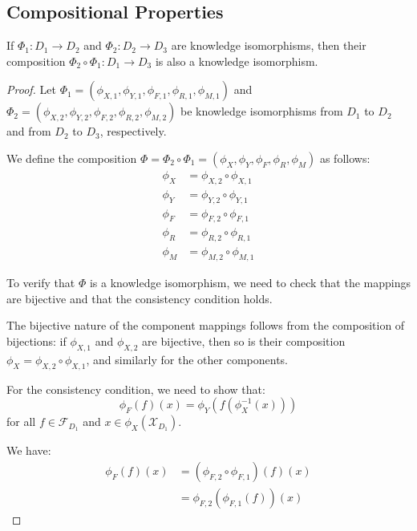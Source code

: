 \subsection{Compositional Properties}

\begin{theorem}
If $\Phi_1: D_1 \to D_2$ and $\Phi_2: D_2 \to D_3$ are knowledge isomorphisms, then their composition $\Phi_2 \circ \Phi_1: D_1 \to D_3$ is also a knowledge isomorphism.
\end{theorem}

\begin{proof}
Let $\Phi_1 = (\phi_{X,1}, \phi_{Y,1}, \phi_{F,1}, \phi_{R,1}, \phi_{M,1})$ and $\Phi_2 = (\phi_{X,2}, \phi_{Y,2}, \phi_{F,2}, \phi_{R,2}, \phi_{M,2})$ be knowledge isomorphisms from $D_1$ to $D_2$ and from $D_2$ to $D_3$, respectively.

We define the composition $\Phi = \Phi_2 \circ \Phi_1 = (\phi_X, \phi_Y, \phi_F, \phi_R, \phi_M)$ as follows:
\begin{align}
\phi_X &= \phi_{X,2} \circ \phi_{X,1} \\
\phi_Y &= \phi_{Y,2} \circ \phi_{Y,1} \\
\phi_F &= \phi_{F,2} \circ \phi_{F,1} \\
\phi_R &= \phi_{R,2} \circ \phi_{R,1} \\
\phi_M &= \phi_{M,2} \circ \phi_{M,1}
\end{align}

To verify that $\Phi$ is a knowledge isomorphism, we need to check that the mappings are bijective and that the consistency condition holds.

The bijective nature of the component mappings follows from the composition of bijections: if $\phi_{X,1}$ and $\phi_{X,2}$ are bijective, then so is their composition $\phi_X = \phi_{X,2} \circ \phi_{X,1}$, and similarly for the other components.

For the consistency condition, we need to show that:
\begin{equation}
\phi_F(f)(x) = \phi_Y(f(\phi_X^{-1}(x)))
\end{equation}
for all $f \in \mathcal{F}_{D_1}$ and $x \in \phi_X(\mathcal{X}_{D_1})$.

We have:
\begin{align}
\phi_F(f)(x) &= (\phi_{F,2} \circ \phi_{F,1})(f)(x) \\
&= \phi_{F,2}(\phi_{F,1}(f))(x)
\end{align}


\end{proof}
